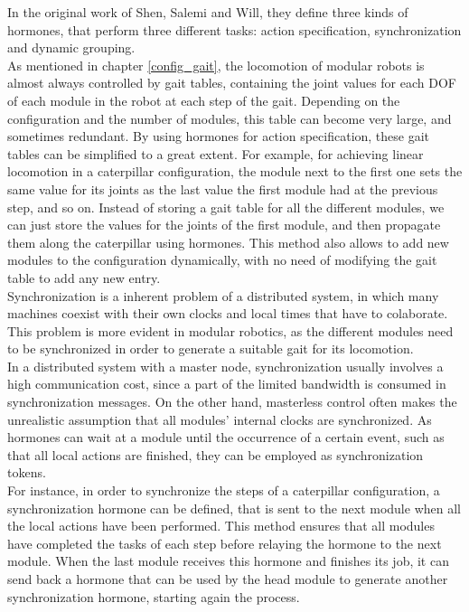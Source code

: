 In the original work of Shen, Salemi and Will, they define three kinds of hormones, that perform three different tasks: action specification, synchronization and dynamic grouping.\\

As mentioned in chapter \ref{config_gait}, the locomotion of modular robots is almost always controlled by gait tables, containing the joint values for each DOF of each module in the robot at each step of the gait. Depending on the configuration and the number of modules, this table can become very large, and sometimes redundant. By using hormones for action specification, these gait tables can be simplified to a great extent. For example, for achieving linear locomotion in a caterpillar configuration, the module next to the first one sets the same value for its joints as the last value the first module had at the previous step, and so on. Instead of storing a gait table for all the different modules, we can just store the values for the joints of the first module, and then propagate them along the caterpillar using hormones. This method also allows to add new modules to the configuration dynamically, with no need of modifying the gait table to add any new entry.\\

Synchronization is a inherent problem of a distributed system, in which many machines coexist with their own clocks and local times that have to colaborate. This problem is more evident in modular robotics, as the different modules need to be synchronized in order to generate a suitable gait for its locomotion.\\

In a distributed system with a master node, synchronization usually involves a high communication cost, since a part of the limited bandwidth is consumed in synchronization messages. On the other hand, masterless control often makes the unrealistic assumption that all modules' internal clocks are synchronized. As hormones can wait at a module until the occurrence of a certain event, such as that all local actions are finished, they can be employed as synchronization tokens.\\

For instance, in order to synchronize the steps of a caterpillar configuration, a synchronization hormone can be defined, that is sent to the next module when all the local actions have been performed. This method ensures that all modules have completed the tasks of each step before relaying the hormone to the next module. When the last module receives this hormone and finishes its job, it can send back a hormone that can be used by the head module to generate another synchronization hormone, starting again the process.\\


